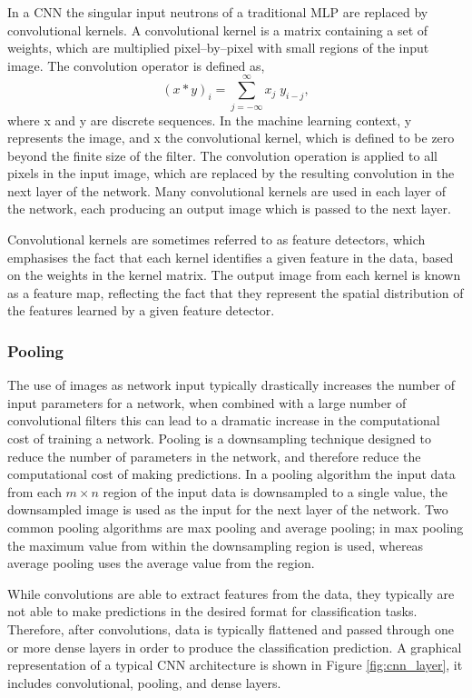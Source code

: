 In a CNN the singular input neutrons of a traditional MLP are replaced by
convolutional kernels. A convolutional kernel is a matrix containing a set of 
weights, which are multiplied pixel--by--pixel with small regions of the input 
image. The convolution operator is defined as, 
\begin{equation}
	\left( x * y \right)_i = \sum_{j = - \infty}^{\infty} x_j \; y_{i-j},
\end{equation}
where x and y are discrete sequences. In the machine learning context, y
represents the image, and x the convolutional kernel, which is defined to be
zero beyond the finite size of the filter. The convolution operation is applied
to all pixels in the input image, which are replaced by the resulting 
convolution in the next layer of the network. Many convolutional kernels are 
used in each layer of the network, each producing an output image which is 
passed to the next layer. 

Convolutional kernels are sometimes referred to as feature detectors, which 
emphasises the fact that each kernel identifies a given feature in the data, 
based on the weights in the kernel matrix. The output image from each kernel 
is known as a feature map, reflecting the fact that they represent the spatial 
distribution of the features learned by a given feature detector. 

\subsubsection*{Pooling}
The use of images as network input typically drastically increases the number of
input parameters for a network, when combined with a large number of
convolutional filters this can lead to a dramatic increase in the computational
cost of training a network. Pooling \cite{5537907} is a downsampling technique 
designed to reduce the number of parameters in the network, and therefore 
reduce the computational cost of making predictions. In a pooling algorithm 
the input data from each $m \times n$ region of the input data is downsampled 
to a single value, the downsampled image is used as the input for the next 
layer of the network. Two common pooling algorithms are max pooling and 
average pooling; in max pooling the maximum value from within the downsampling 
region is used, whereas average pooling uses the average value from the region.

\bigskip

While convolutions are able to extract features from the data, they typically
are not able to make predictions in the desired format for classification tasks.
Therefore, after convolutions, data is typically flattened and passed through
one or more dense layers in order to produce the classification prediction. A
graphical representation of a typical CNN architecture is shown in Figure
\ref{fig:cnn_layer}, it includes convolutional, pooling, and dense layers.

